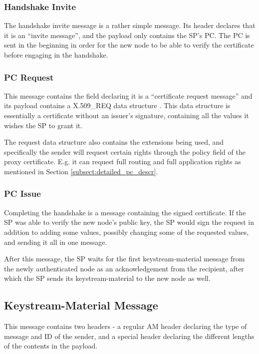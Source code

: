\subsubsection*{Handshake Invite}
The handshake invite message is a rather simple message. Its header declares
that it is an ``invite message'', and the payload only contains the SP's 
\ac{PC}. The \ac{PC} is sent in the beginning in order for the new node to be
able to verify the certificate before engaging in the handshake.

\subsubsection*{\acl{PC} Request}
This message contains the field declaring it is a ``certificate request
message'' and its payload contains a X.509\_REQ data structure
\cite{viega2002network}. This data structure is essentially a certificate
without an issuer's signature, containing all the values it wishes the \ac{SP}
to grant it.

The request data structure also contains the extensions being used, and
specifically the sender will request certain rights through the policy field of
the proxy certificate. E.g. it can request full routing and full application
rights as mentioned in Section \ref{subsect:detailed_pc_descr}.

\subsubsection*{\acf{PC} Issue}
Completing the handshake is a message containing the signed certificate. If the
\ac{SP} was able to verify the new node's public key, the \ac{SP} would sign the
request in addition to adding some values, possibly changing some of the
requested values, and sending it all in one message.

After this message, the \ac{SP} waits for the first keystream-material message
from the newly authenticated node as an acknowledgement from the recipient,
after which the \ac{SP} sends its keystream-material to the new node as well.

\subsection{Keystream-Material Message}
This message contains two headers - a regular AM header declaring the type of
message and ID of the sender, and a special header declaring the different
lengths of the contents in the payload.

